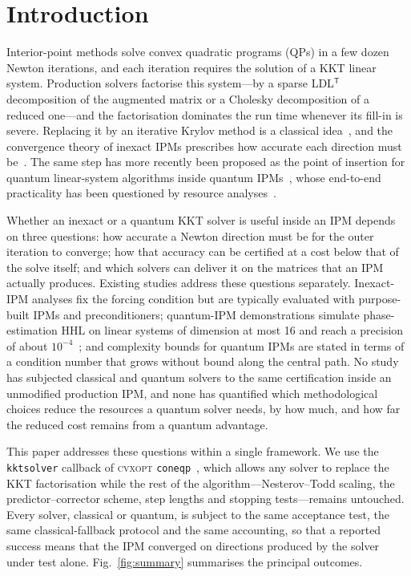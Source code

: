 \documentclass[11pt]{article}
\theoremstyle{definition}
\newcommand{\T}{^{\mathsf T}}
\begin{document}
\section{Introduction}\label{sec:intro}
Interior-point methods solve convex quadratic programs (QPs) in a few dozen Newton iterations, and each iteration requires the solution of a KKT linear system. Production solvers factorise this system---by a sparse LDL$\T$ decomposition of the augmented matrix or a Cholesky decomposition of a reduced one---and the factorisation dominates the run time whenever its fill-in is severe. Replacing it by an iterative Krylov method is a classical idea~\cite{gondzio2012matrixfree,bergamaschi2004preconditioning}, and the convergence theory of inexact IPMs prescribes how accurate each direction must be~\cite{bellavia1998inexact,aljeiroudi2009convergence,gondzio2013convergence,dexter2022inexact}. The same step has more recently been proposed as the point of insertion for quantum linear-system algorithms inside quantum IPMs~\cite{kerenidis2020qipm,augustino2023qipm,wu2023inexact,mohammadisiahroudi2024efficient,mohammadisiahroudi2025improvements}, whose end-to-end practicality has been questioned by resource analyses~\cite{dalzell2023endtoend}.

Whether an inexact or a quantum KKT solver is useful inside an IPM depends on three questions: how accurate a Newton direction must be for the outer iteration to converge; how that accuracy can be certified at a cost below that of the solve itself; and which solvers can deliver it on the matrices that an IPM actually produces. Existing studies address these questions separately. Inexact-IPM analyses fix the forcing condition but are typically evaluated with purpose-built IPMs and preconditioners; quantum-IPM demonstrations simulate phase-estimation HHL on linear systems of dimension at most 16 and reach a precision of about $10^{-4}$~\cite{mohammadisiahroudi2025improvements}; and complexity bounds for quantum IPMs are stated in terms of a condition number that grows without bound along the central path. No study has subjected classical and quantum solvers to the same certification inside an unmodified production IPM, and none has quantified which methodological choices reduce the resources a quantum solver needs, by how much, and how far the reduced cost remains from a quantum advantage.

This paper addresses these questions within a single framework. We use the \texttt{kktsolver} callback of \textsc{cvxopt} \texttt{coneqp}~\cite{cvxopt,andersen2011ipm}, which allows any solver to replace the KKT factorisation while the rest of the algorithm---Nesterov--Todd scaling, the predictor--corrector scheme, step lengths and stopping tests---remains untouched. Every solver, classical or quantum, is subject to the same acceptance test, the same classical-fallback protocol and the same accounting, so that a reported success means that the IPM converged on directions produced by the solver under test alone. Fig.~\ref{fig:summary} summarises the principal outcomes.
\end{document}
